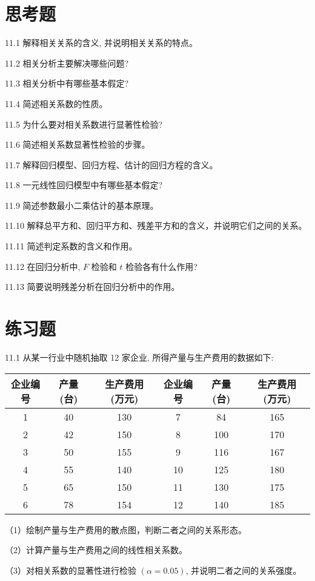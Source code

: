 \documentclass[10pt]{article}
\begin{document}
\begin{CJK*}{UTF8}{bsmi}
\section*{思考题}
11.1 解释相关关系的含义, 并说明相关关系的特点。

11.2 相关分析主要解决哪些问题?

11.3 相关分析中有哪些基本假定?

11.4 简述相关系数的性质。

11.5 为什么要对相关系数进行显著性检验?

11.6 简述相关系数显著性检验的步骤。

11.7 解释回归模型、回归方程、估计的回归方程的含义。

11.8 一元线性回归模型中有哪些基本假定?

11.9 简述参数最小二乘估计的基本原理。

11.10 解释总平方和、回归平方和、残差平方和的含义，并说明它们之间的关系。

11.11 简述判定系数的含义和作用。

11.12 在回归分析中, $F$ 检验和 $t$ 检验各有什么作用?

11.13 简要说明残差分析在回归分析中的作用。

\section*{练习题}
11.1 从某一行业中随机抽取 12 家企业, 所得产量与生产费用的数据如下:

\begin{center}
\begin{tabular}{ccc||ccc}
\hline
企业编号 & 产量 (台) & 生产费用 (万元) & 企业编号 & 产量 (台) & 生产费用 (万元) \\
\hline
1 & 40 & 130 & 7 & 84 & 165 \\
2 & 42 & 150 & 8 & 100 & 170 \\
3 & 50 & 155 & 9 & 116 & 167 \\
4 & 55 & 140 & 10 & 125 & 180 \\
5 & 65 & 150 & 11 & 130 & 175 \\
6 & 78 & 154 & 12 & 140 & 185 \\
\hline
\end{tabular}
\end{center}

（1）绘制产量与生产费用的散点图，判断二者之间的关系形态。

（2）计算产量与生产费用之间的线性相关系数。

（3）对相关系数的显著性进行检验 $(\alpha=0.05)$, 并说明二者之间的关系强度。


\end{CJK*}
\end{document}
